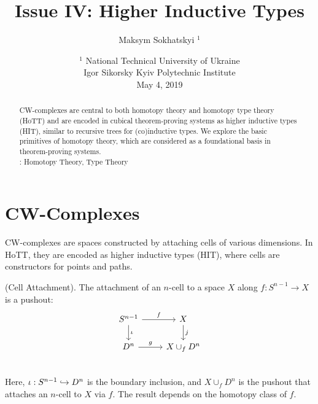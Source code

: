 \documentclass{article}
\begin{document}
\title{Issue IV: Higher Inductive Types}
\author{Maksym Sokhatskyi $^1$}
\date{ $^1$ National Technical University of Ukraine \\
       \small Igor Sikorsky Kyiv Polytechnic Institute \\
       May 4, 2019 }
\maketitle

\begin{abstract}
CW-complexes are central to both homotopy theory and homotopy type theory (HoTT) and are encoded
in cubical theorem-proving systems as higher inductive types (HIT), similar to recursive
trees for (co)inductive types. We explore the basic primitives of homotopy theory,
which are considered as a foundational basis in theorem-proving systems. \\
: Homotopy Theory, Type Theory
\end{abstract}


\ifincludeTOC
  \tableofcontents
\else
\fi

\section{CW-Complexes}
CW-complexes are spaces constructed by attaching cells of various
dimensions. In HoTT, they are encoded as higher inductive types (HIT),
where cells are constructors for points and paths.

\begin{definition} (Cell Attachment).
The attachment of an $n$-cell to a space \( X \)
along \( f : S^{n-1} \to X \) is a pushout:
\[
\begin{tikzcd}
S^{n-1} \arrow[r, "f"] \arrow[d, "\iota"] & X \arrow[d, "j"] \\
D^n \arrow[r, "g"]                        & X \cup_f D^n \\
\end{tikzcd}
\]
Here, \( \iota : S^{n-1} \hookrightarrow D^n \) is the boundary inclusion,
and \( X \cup_f D^n \) is the pushout that attaches an $n$-cell to \( X \) via \( f \). The result depends on
the homotopy class of \( f \).
\end{definition}
\end{document}
